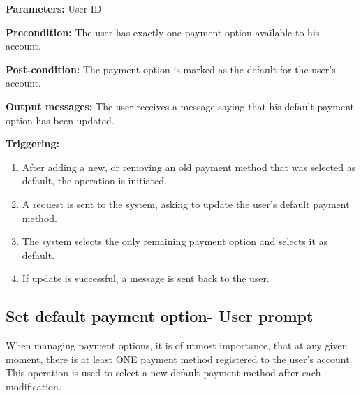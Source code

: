 \begin{description}

\item \textbf{Parameters:} User ID

\item \textbf{Precondition:} The user has exactly one payment option available
to his account.

\item \textbf{Post-condition:} The payment option is marked as the
default for the user's account.

\item \textbf{Output messages:} The user receives a message saying that his
default payment option has been updated.

\item \textbf{Triggering:}
\begin{enumerate}
\item After adding a new, or removing an old payment method that was selected as
default, the operation is initiated.

\item A request is sent to the system, asking to update the user's default
payment method.

\item The system selects the only remaining payment option and selects it as
default.

\item If update is successful, a message is sent back to the user.

\end{enumerate}

\end{description}

\subsection{Set default payment option- User prompt}

 When managing payment options, it is of utmost importance, that at any given
 moment, there is at least ONE payment method registered to the user's account.
 This operation is used to select a new default payment method after each
 modification.

